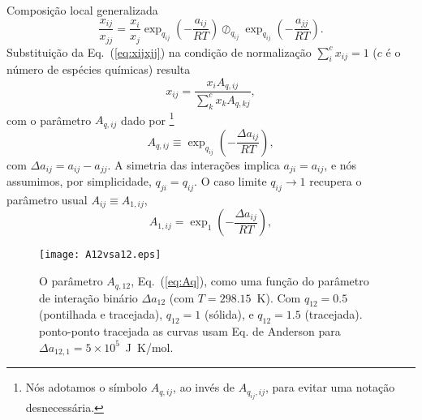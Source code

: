 \documentclass{beamer}
\begin{document}
\begin{frame}{Composição local generalizada}
\begin{equation}
\frac{x_{ij}}{x_{jj}}=
\label{eq:xijxjj}
                       \frac{x_i}{x_j}
                       \exp_{q_{ij}}\left(-\frac{a_{ij}}{RT}\right) 
                       \oslash_{q_{ij}}
                       \exp_{q_{ij}}\left(-\frac{a_{jj}}{RT}\right).
\end{equation}
%
Substituição da Eq.~(\ref{eq:xijxjj}) 
na condição de normalização  
$\sum_i^c x_{ij}=1$ ($c$ é o número de espécies químicas) resulta
%
\begin{equation}
\label{eq:xij}
 x_{ij}=\frac{x_i A_{q,ij}}{\sum_k^c x_k A_{q,kj}},
\end{equation}
%
com o parâmetro $A_{q,ij}$ dado por%
\footnote{Nós adotamos o símbolo $A_{q,ij}$, ao invés de 
$A_{q_{ij},ij}$, para evitar uma notação desnecessária.}
%
\begin{equation}
\label{eq:Aq}
 A_{q,ij} \equiv \exp_{q_{ij}}\left(-\frac{\Delta a_{ij}}{RT}\right),
\end{equation}
%
com $\Delta a_{ij}=a_{ij}-a_{jj}$. 
A simetria das interações implica  $a_{ji}=a_{ij}$,
e nós assumimos, por simplicidade, $q_{ji}=q_{ij}$.
O caso limite $q_{ij}\to 1$ 
recupera o parâmetro usual
$A_{ij}\equiv A_{1,ij}$,
%
\begin{equation}
\label{eq:A1}
 A_{1,ij}=\exp_1\left( - \frac{\Delta a_{ij}}{RT}\right),
\end{equation}
%
\end{frame}


\begin{frame}
%
\begin{figure}[htb]
\begin{center}
 \texttt{[image: A12vsa12.eps]}
\end{center}
\caption{\label{fig:A12-a12}%
         O parâmetro  $A_{q,12}$, Eq.~(\protect\ref{eq:Aq}), como uma função do 
          parâmetro de interação binário $\Delta a_{12}$ (com $T=298.15$~K).
         Com $q_{12}=0.5$ (pontilhada e tracejada), $q_{12}=1$ (sólida), 
         e $q_{12}=1.5$ (tracejada).
         ponto-ponto tracejada as curvas usam Eq.  de Anderson para 
         $\Delta a_{12,1}=5\times10^5$~J~K/mol.
}
\end{figure}
%
\end{frame}
\end{document}
